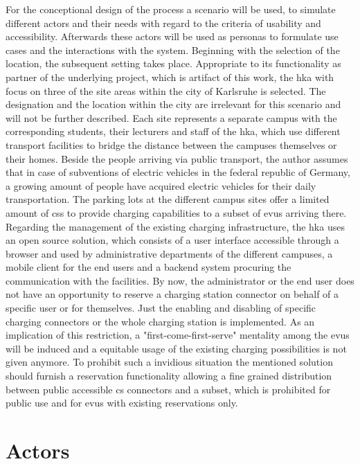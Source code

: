 For the conceptional design of the process a scenario will be used, to simulate different actors and their needs with regard to the criteria of usability and accessibility. Afterwards these actors will be used as personas to formulate use cases and the interactions with the system. 
Beginning with the selection of the location, the subsequent setting takes place. Appropriate to its functionality as partner of the underlying project, which is artifact of this work, the \acrfull{hka} with focus on three of the site areas within the city of Karlsruhe is selected.
The designation and the location within the city are irrelevant for this scenario and will not be further described.
Each site represents a separate campus with the corresponding students, their lecturers and staff of the \acrshort{hka}, which use different transport facilities to bridge the distance between the campuses themselves or their homes. 
Beside the people arriving via public transport, the author assumes that in case of subventions of electric vehicles in the federal republic of Germany, a growing amount of people have acquired electric vehicles for their daily transportation. 
The parking lots at the different campus sites offer a limited amount of \acrfull{cs}s to provide charging capabilities to a subset of \acrfull{evu}s arriving there. 
Regarding the management of the existing charging infrastructure, the \acrshort{hka} uses an open source solution, which consists of a user interface accessible through a browser and used by administrative departments of the different campuses, a mobile client for the end users and a backend system procuring the communication with the facilities. 
By now, the administrator or the end user does not have an opportunity to reserve a charging station connector on behalf of a specific user or for themselves.
Just the enabling and disabling of specific charging connectors or the whole charging station is implemented.
As an implication of this restriction, a "first-come-first-serve" mentality among the \acrshort{evu}s will be induced and a equitable usage of the existing charging possibilities is not given anymore.
To prohibit such a invidious situation the mentioned solution should furnish a reservation functionality allowing a fine grained distribution between public accessible \acrshort{cs} connectors and a subset, which is prohibited for public use and for \acrshort{evu}s with existing reservations only.

\section{Actors}
\label{ch:Requirements Engineering:sec:Actors}

